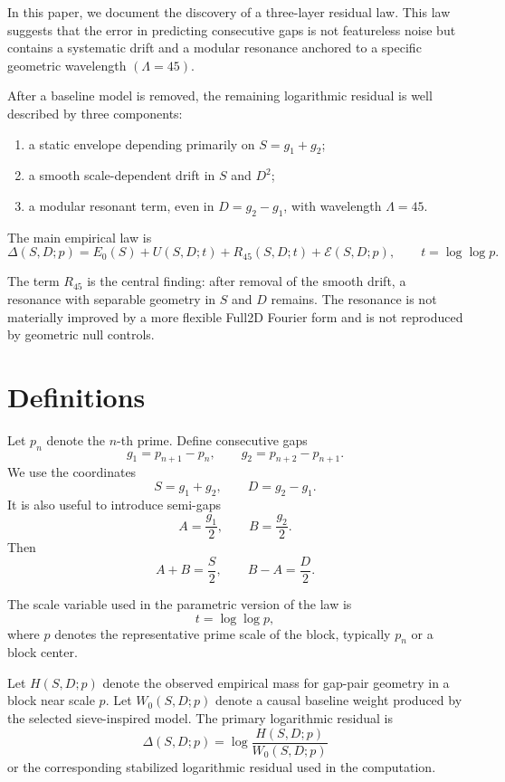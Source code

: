 \documentclass[11pt]{article}
\begin{document}
In this paper, we document the discovery of a three-layer residual law. This law suggests that the error in predicting consecutive gaps is not featureless noise but contains a systematic drift and a modular resonance anchored to a specific geometric wavelength \((\Lambda=45)\).

After a baseline model is removed, the remaining logarithmic residual is well described by three components:
\begin{enumerate}[label=\arabic*.]
\item a static envelope depending primarily on \(S=g_1+g_2\);
\item a smooth scale-dependent drift in \(S\) and \(D^2\);
\item a modular resonant term, even in \(D=g_2-g_1\), with wavelength \(\Lambda=45\).
\end{enumerate}

The main empirical law is
\[
\Delta(S,D;p)=E_0(S)+U(S,D;t)+R_{45}(S,D;t)+\mathcal{E}(S,D;p),\qquad t=\log\log p.
\]

The term \(R_{45}\) is the central finding: after removal of the smooth drift, a resonance with separable geometry in \(S\) and \(D\) remains. The resonance is not materially improved by a more flexible Full2D Fourier form and is not reproduced by geometric null controls.

\section{Definitions}

Let \(p_n\) denote the \(n\)-th prime. Define consecutive gaps
\[
g_1=p_{n+1}-p_n,\qquad g_2=p_{n+2}-p_{n+1}.
\]
We use the coordinates
\[
S=g_1+g_2,\qquad D=g_2-g_1.
\]
It is also useful to introduce semi-gaps
\[
A=\frac{g_1}{2},\qquad B=\frac{g_2}{2}.
\]
Then
\[
A+B=\frac{S}{2},\qquad B-A=\frac{D}{2}.
\]

The scale variable used in the parametric version of the law is
\[
t=\log\log p,
\]
where \(p\) denotes the representative prime scale of the block, typically \(p_n\) or a block center.

Let \(H(S,D;p)\) denote the observed empirical mass for gap-pair geometry in a block near scale \(p\). Let \(W_0(S,D;p)\) denote a causal baseline weight produced by the selected sieve-inspired model. The primary logarithmic residual is
\[
\Delta(S,D;p)=\log\frac{H(S,D;p)}{W_0(S,D;p)}
\]
or the corresponding stabilized logarithmic residual used in the computation.
\end{document}
